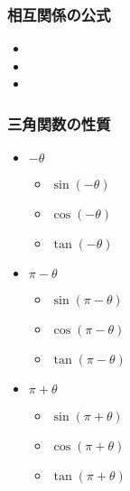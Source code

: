 \documentclass[10pt,dvipdfmx]{jsarticle}
\begin{document}
\subsubsection*{相互関係の公式}
\begin{multicols}{3}
  \begin{LARGE}
    \begin{itemize}
      \item
      \item
      \item
    \end{itemize}
  \end{LARGE}
\end{multicols}

\subsubsection*{三角関数の性質}
\begin{multicols}{3}
  \begin{itemize}
    \item $-\theta$
          \begin{itemize}
            \item $\sin(-\theta)$
            \item $\cos(-\theta)$
            \item $\tan(-\theta)$
          \end{itemize}
    \item $\pi-\theta$
          \begin{itemize}
            \item $\sin(\pi-\theta)$
            \item $\cos(\pi-\theta)$
            \item $\tan(\pi-\theta)$
          \end{itemize}
    \item $\pi+\theta$
          \begin{itemize}
            \item $\sin(\pi+\theta)$
            \item $\cos(\pi+\theta)$
            \item $\tan(\pi+\theta)$
          \end{itemize}
  \end{itemize}
\end{multicols}
\end{document}
